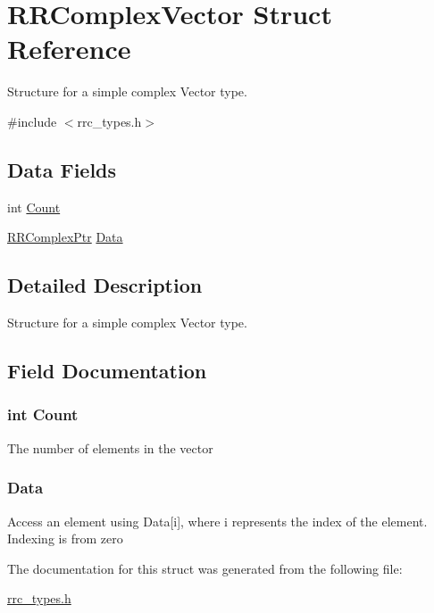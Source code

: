 \hypertarget{struct_r_r_complex_vector}{\section{R\+R\+Complex\+Vector Struct Reference}
\label{struct_r_r_complex_vector}
}


Structure for a simple complex Vector type.  




{\ttfamily \#include $<$rrc\+\_\+types.\+h$>$}

\subsection*{Data Fields}
\begin{DoxyCompactItemize}
\item 
int \hyperlink{struct_r_r_complex_vector_aad462966ed963f892117056de1eba502}{Count}
\item 
\hyperlink{rrc__types_8h_ada2046d7326c56ae29d8510fbf6622ee}{R\+R\+Complex\+Ptr} \hyperlink{struct_r_r_complex_vector_a2853286fc6b37960bba4c8871da839fa}{Data}
\end{DoxyCompactItemize}


\subsection{Detailed Description}
Structure for a simple complex Vector type. 

\subsection{Field Documentation}
\hypertarget{struct_r_r_complex_vector_aad462966ed963f892117056de1eba502}{
\subsubsection[{Count}]{\setlength{\rightskip}{0pt plus 5cm}int Count}}\label{struct_r_r_complex_vector_aad462966ed963f892117056de1eba502}
The number of elements in the vector \hypertarget{struct_r_r_complex_vector_a2853286fc6b37960bba4c8871da839fa}{
\subsubsection[{Data}]{ Data}}\label{struct_r_r_complex_vector_a2853286fc6b37960bba4c8871da839fa}
Access an element using Data\mbox{[}i\mbox{]}, where i represents the index of the element. Indexing is from zero 

The documentation for this struct was generated from the following file\+:\begin{DoxyCompactItemize}
\item 
\hyperlink{rrc__types_8h}{rrc\+\_\+types.\+h}\end{DoxyCompactItemize}
